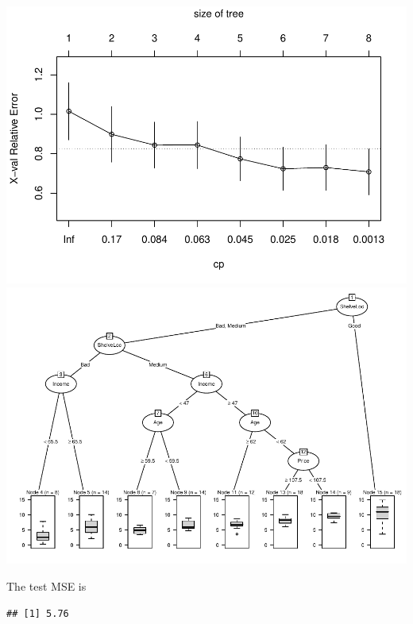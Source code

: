 \documentclass[
]{article}
\begin{document}
\includegraphics{A3_files/figure-latex/unnamed-chunk-5-1.pdf}
\includegraphics{A3_files/figure-latex/unnamed-chunk-5-2.pdf}

The test MSE is

\begin{verbatim}
## [1] 5.76
\end{verbatim}
\end{document}
